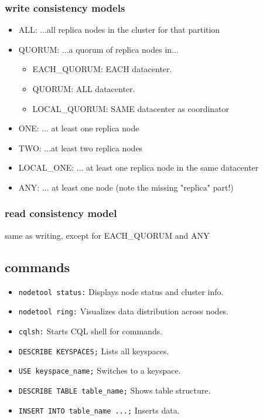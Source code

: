 \subsubsection{write consistency models}
\begin{itemize}
  \item ALL: ...all replica nodes in the cluster for that partition
  \item QUORUM: ...a quorum of replica nodes in...
    \begin{itemize}
        \item EACH\_QUORUM: EACH datacenter.
        \item QUORUM: ALL datacenter.
        \item LOCAL\_QUORUM: SAME datacenter as coordinator
    \end{itemize}
  \item ONE: ... at least one replica node
  \item TWO: ...at least two replica nodes
  \item LOCAL\_ONE: ... at least one replica node in the same datacenter
  \item ANY: ... at least one node (note the missing "replica" part!)
\end{itemize}
\subsubsection{read consistency model}
same as writing, except for EACH\_QUORUM and ANY
\subsection{commands}
\begin{itemize}
 \item \texttt{nodetool status:} Displays node status and cluster info.
  \item \texttt{nodetool ring:} Visualizes data distribution across nodes.
  \item \texttt{cqlsh:} Starts CQL shell for commands.
  \item \texttt{DESCRIBE KEYSPACES;} Lists all keyspaces.
  \item \texttt{USE keyspace\_name;} Switches to a keyspace.
  \item \texttt{DESCRIBE TABLE table\_name;} Shows table structure.
  \item \texttt{INSERT INTO table\_name ...;} Inserts data.
\end{itemize}